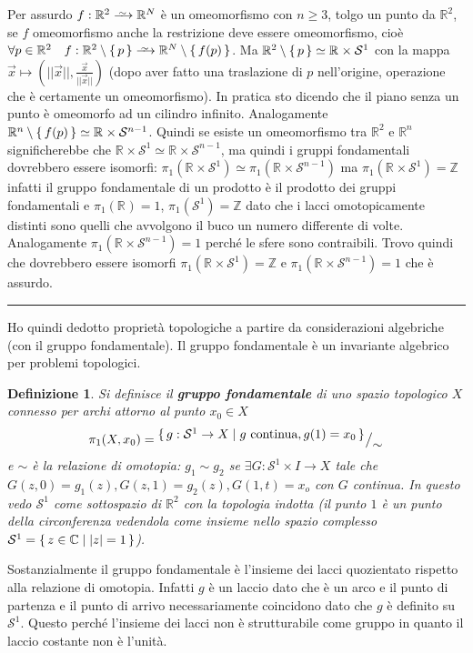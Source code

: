 \documentclass[10pt, twoside=false, x11names]{scrbook}
\newtheorem{definition}[theorem]{Definizione}
\newenvironment{proof}{{\textbf{Dimostrazione}:}}{\hfill\rule{2mm}{2mm} \newline}
\newcommand{\Z}{\mathbb{Z}}
\newcommand{\RN}[1][]{\mathbb{R}^#1}
\newcommand{\Sph}[1][]{\mathcal{S}^#1}
\newcommand{\homoto}{\xrightarrow{\,\smash{\raisebox{-0.65ex}{\ensuremath{\scriptstyle\sim}}}\,}}
\newcommand*\quot[2]{{^{\textstyle #1}\big/_{\textstyle #2}}}
\begin{document}
\newmathsymb{homoto}{\homoto}{Omeomorfismo}
\begin{proof}
  Per assurdo $ f : \RN{2} \homoto \RN{N} $ è un omeomorfismo con
  $ n \geq 3 $, tolgo un punto da $ \RN{2} $, se $ f $ omeomorfismo anche la restrizione deve essere omeomorfismo, cioè
  $ \forall p \in \RN{2} \quad f:\RN{2} \setminus \set{p} \homoto \RN{N} \setminus \set{f(p)} $.
  Ma $ \RN{2} \setminus \set{p} \simeq \RN{} \times \mathcal{S}^1 $ con la mappa
  $ \vec{x} \mapsto \left( || \vec{x} ||, \frac{\vec{x}}{|| \vec{x} ||} \right) $ (dopo aver fatto
  una traslazione di $ p $ nell'origine, operazione che è certamente un omeomorfismo). In pratica
  sto dicendo che il piano senza un punto è omeomorfo ad un cilindro infinito.
  Analogamente $ \RN{n} \setminus \set{f(p)} \simeq \RN{} \times \Sph{n-1} $. Quindi se esiste un omeomorfismo tra $ \RN{2} $ e
  $ \RN{n} $ significherebbe che $ \RN{} \times \Sph{1} \simeq \RN{} \times \Sph{n-1} $, ma quindi i gruppi fondamentali
  dovrebbero essere isomorfi:
  $ \pi_1 (\RN{} \times \Sph{1}) \simeq \pi_1(\RN{}\times \Sph{n-1}) $ ma
  $ \pi_1 (\RN{} \times \Sph{1}) = \Z $ infatti il gruppo fondamentale di un prodotto è il prodotto dei gruppi
  fondamentali e $ \pi_1(\RN{}) = 1 $, $ \pi_1(\Sph{1}) = \Z $ dato che i lacci omotopicamente distinti
  sono quelli che avvolgono il buco un numero differente di volte. Analogamente $ \pi_1(\RN{}\times \Sph{n-1}) = 1 $
  perché le sfere sono contraibili. Trovo quindi che dovrebbero essere isomorfi $ \pi_1 (\RN{} \times \Sph{1}) = \Z $
  e $ \pi_1(\RN{}\times \Sph{n-1}) = 1 $ che è assurdo.
\end{proof}

Ho quindi dedotto proprietà topologiche a partire da considerazioni algebriche (con il gruppo fondamentale).
Il gruppo fondamentale è un invariante algebrico per problemi topologici.

\begin{definition}
  Si definisce il \textbf{gruppo fondamentale} di uno spazio topologico $ X $
  connesso per archi attorno al punto $ x_0 \in X $
  \[
    \pi_1 (X, x_0) = \quot{\set{ g: \Sph{1} \to X | g \text{ continua}, g(1) = x_0}}{\sim}
  \]
  e $ \sim $ è la relazione di omotopia: $ g_1 \sim g_2 $ se $ \exists G: \mathcal{S}^1 \times I \to X  $ tale che
  $ G(z,0) = g_1(z), G(z,1) = g_2(z), G(1,t) = x_o $ con $ G $ continua. In questo vedo $ \Sph{1} $ come sottospazio
  di $ \RN{2} $ con la topologia indotta (il punto $ 1 $ è un punto della circonferenza vedendola come
  insieme nello spazio complesso $ \Sph{1} = \set{ z \in \mathbb{C} | |z| = 1} $).
\end{definition}
Sostanzialmente il gruppo fondamentale è l'insieme dei lacci quozientato rispetto alla relazione di omotopia.
Infatti $ g $ è un laccio dato che è un arco e il punto di partenza e il punto di arrivo necessariamente
coincidono dato che $ g $ è definito su $ \Sph{1} $.
Questo perché l'insieme dei lacci non è strutturabile come gruppo in quanto il laccio costante non è
l'unità.
\end{document}
